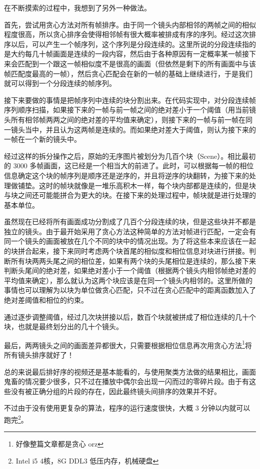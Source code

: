 \documentclass[a4paper, fontset=none]{article}
\begin{document}
在不断摸索的过程中，我想到了另外一种做法。

首先，尝试用贪心方法对所有帧排序。由于同一个镜头内部相邻的两帧之间的相似程度很高，所以贪心排序会使得相邻帧有很大概率被排成有序的序列。经过这次排序以后，可以产生一个帧序列，这个序列是分段连续的。这里所说的分段连续指的是大约每几十帧画面是连续的一段内容，然后由于各种原因有一定概率某一帧接下来会匹配到一个跟这一帧相似度不是很高的画面（但依然是剩下的所有画面中与该帧匹配度最高的一帧），然后贪心匹配会在新的一帧的基础上继续进行，于是我们就可以得到一个分段连续的帧序列。

接下来要做的事情是把帧序列中连续的块分割出来。在代码实现中，对分段连续帧序列顺序扫描，如果接下来的一帧与前一帧之间的绝对差小于一个阈值（用当前镜头所有相邻帧两两之间的绝对差的平均值来确定），则接下来的一帧与前一帧在同一镜头当中，并且认为这两帧是连续的。而如果绝对差大于阈值，则认为接下来的一帧在一个新的镜头中。

经过这样的拆分操作之后，原始的无序图片被划分为几百个块（Scene）。相比最初的 3000 多帧画面，这已经是一个相当大的前进了。此时，可以根据每一帧的相位信息确定这个块的帧序列是顺序还是逆序的，并且将逆序的块翻转，为接下来的处理做铺垫。这时的帧块就像是一堆乐高积木一样，每个块内部都是连续的，但是块与块之间还可能能拼合为更大的块。在接下来的处理过程中，帧块就是进行处理的基本单位。

虽然现在已经将所有画面成功分割成了几百个分段连续的块，但是这些块并不都是独立的镜头。由于最开始采用了贪心方法这种简单的方法对帧进行匹配，一定会有同一个镜头的画面被放在几个不同的块中的情况出现。为了将这些本来应该在一起的块拼合起来，接下来同时考虑两个块首尾的相似度和相位信息对块进行拼接。判断所有块两两头尾之间的相位差，如果有两个块的头尾相位是连续的，那么接下来判断头尾间的绝对差，如果绝对差小于一个阈值（根据两个镜头内相邻帧绝对差的平均值来确定），那么就认为这两个块应该是在同一个镜头内相邻的。这里所做的事情也可以理解为以块为单位做贪心匹配，只不过在贪心匹配中的距离函数加入了绝对差阈值和相位的约束。

通过逐步调整阈值，经过几次块拼接以后，数百个块就被拼成了相位连续的几十个块，也就是最终划分出的几十个镜头。

最后，两两镜头之间的画面差异都很大，只需要根据相位信息再次用贪心方法\footnote{好像整篇文章都是贪心 orz}将所有镜头排序就好了！

总的来说最后排好序的视频还是基本能看的，与使用聚类方法做的结果相比，画面鬼畜的情况要少很多，只不过在播放中偶尔会出现一闪而过的零碎片段。由于有这些没有被正确分组的片段的存在，因此最终镜头间排序的效果并不好。

不过由于没有使用更复杂的算法，程序的运行速度很快，大概 3 分钟以内就可以跑完\footnote{Intel i5 4核，8G DDL3 低压内存，机械硬盘}。
\end{document}
